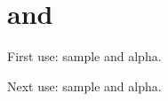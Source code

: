 \documentclass[12pt]{article}
\begin{document}
\tableofcontents
\section{\texorpdfstring{ and }{Sample and alpha}}


First use: \gls{sample} and \gls{alpha}.


Next use: \gls{sample} and \gls{alpha}.


\printunsrtglossary 
\end{document}
